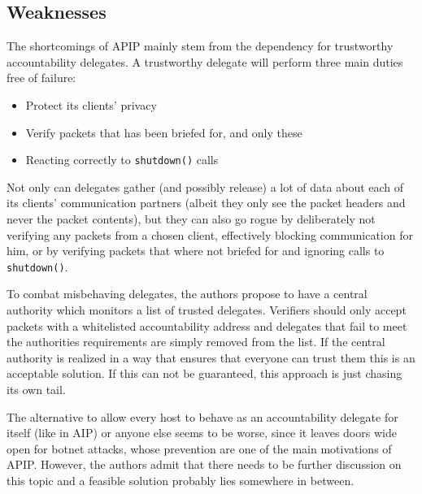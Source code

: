 \documentclass{acm_proc_article-sp}
\begin{document}
\subsection{Weaknesses}
The shortcomings of APIP mainly stem from the dependency for trustworthy accountability delegates. A trustworthy delegate will perform three main duties free of failure:
\begin{itemize}
\item Protect its clients' privacy
\item Verify packets that has been briefed for, and only these
\item Reacting correctly to \texttt{shutdown()} calls 
\end{itemize}
Not only can delegates gather (and possibly release) a lot of data about each of its clients' communication partners (albeit they only see the packet headers and never the packet contents), but they can also go rogue by deliberately not verifying any packets from a chosen client, effectively blocking communication for him, or by verifying packets that where not briefed for and ignoring calls to \texttt{shutdown()}.

To combat misbehaving delegates, the authors propose to have a central authority which monitors a list of trusted delegates. Verifiers should only accept packets with a whitelisted accountability address and delegates that fail to meet the authorities requirements are simply removed from the list. If the central authority is realized in a way that ensures that everyone can trust them this is an acceptable solution. If this can not be guaranteed, this approach is just chasing its own tail.

The alternative to allow every host to behave as an accountability delegate for itself (like in AIP) or anyone else seems to be worse, since it leaves doors wide open for botnet attacks, whose prevention are one of the main motivations of APIP. However, the authors admit that there needs to be further discussion on this topic and a feasible solution probably lies somewhere in between.
\end{document}
